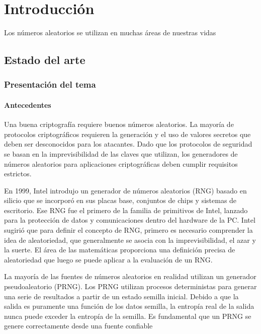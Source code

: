\chapter{Introducción}

	Los números aleatorios se utilizan en muchas áreas de nuestras vidas

	
	
	\section{Estado del arte}
		\subsection{Presentación del tema}
			\subsubsection{Antecedentes}
			
			
			
			
			Una buena criptografía requiere buenos números aleatorios. La mayoría de protocolos criptográficos requieren la generación y el uso de valores secretos que deben ser desconocidos para los atacantes. Dado que los protocolos de seguridad se basan en la imprevisibilidad de las claves que utilizan, los generadores de números aleatorios para aplicaciones criptográficas deben cumplir requisitos estrictos.  \cite{Jun1999}
			
			En 1999, Intel introdujo un generador de números aleatorios (RNG) basado en silicio que se incorporó en sus placas base, conjuntos de chips y sistemas de escritorio. Ese RNG fue el primero de la familia de primitivos de Intel, lanzado para la protección de datos y comunicaciones dentro del hardware de la PC.  Intel sugirió que para definir el concepto de RNG, primero es necesario comprender la idea de aleatoriedad, que generalmente se asocia con la imprevisibilidad, el azar y la suerte. El área de las matemáticas proporciona una definición precisa de aleatoriedad que luego se puede aplicar a la evaluación de un RNG. 	\cite{Jun1999}	\cite{Fraga2017}			
			
			
			La mayoría de las fuentes de números aleatorios en realidad utilizan un generador pseudoaleatorio (PRNG). Los PRNG utilizan procesos deterministas para generar una serie de resultados a partir de un estado semilla inicial. Debido a que la salida es puramente una función de los datos semilla, la entropía real de la salida nunca puede exceder la entropía de la semilla. Es fundamental que un PRNG se genere correctamente desde una fuente confiable \cite{Jun1999}
			
